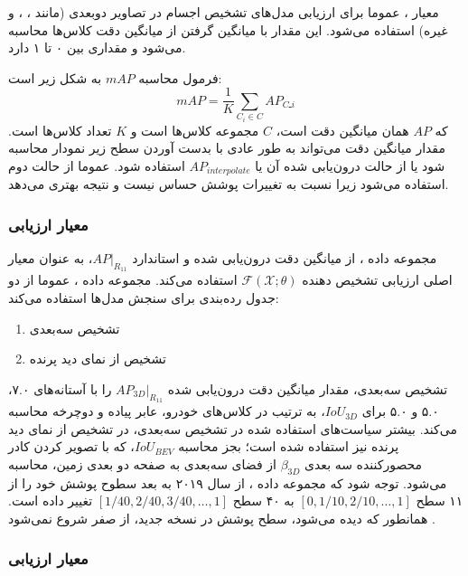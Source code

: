 معیار ، عموما برای ارزیابی مدل‌های تشخیص اجسام در تصاویر دوبعدی (مانند ، ،  و غیره) استفاده می‌شود. این مقدار با میانگین گرفتن از میانگین دقت کلاس‌ها محاسبه می‌شود و مقداری بین ۰ تا ۱ دارد.

فرمول محاسبه‌ $mAP$ به شکل زیر است:
\begin{equation}
    mAP = \frac{1}{K}\sum_{C_i \in C}{AP_{Cـi}}
\end{equation}
 که $AP$ همان میانگین دقت است، $C$ مجموعه کلاس‌ها است و $K$ تعداد کلاس‌ها است. مقدار میانگین دقت می‌تواند به طور عادی با بدست آوردن سطح زیر نمودار محاسبه شود یا از حالت درون‌یابی شده آن یا $AP_{interpolate}$ استفاده شود. عموما از حالت دوم استفاده می‌شود زیرا نسبت به تغییرات پوشش حساس نیست و نتیجه بهتری می‌دهد.

 \subsubsection{معیار ارزیابی }
مجموعه داده ، از میانگین دقت درون‌یابی شده و استاندارد $AP \vert_{R_{11}}$، به عنوان معیار اصلی ارزیابی تشخیص دهنده $\mathcal{F} (\mathcal{X} ; \theta)$ استفاده می‌کند. مجموعه داده ، عموما از دو جدول رده‌بندی برای سنجش مدل‌ها استفاده می‌کند:
\begin{enumerate}
    \item تشخیص سه‌بعدی
    \item  تشخیص از نمای دید پرنده 
\end{enumerate}
تشخیص سه‌بعدی، مقدار میانگین دقت درون‌یابی شده‌ $AP_{3D} \vert_{R_{11}}$ را با آستانه‌های ۷.۰، ۵.۰ و ۵.۰ برای $IoU_{3D}$، به ترتیب در کلاس‌های خودرو، عابر پیاده و دوچرخه محاسبه می‌کند.
بیشتر سیاست‌های استفاده شده در تشخیص سه‌بعدی، در تشخیص از نمای دید پرنده نیز استفاده شده است؛ بجز محاسبه $IoU_{BEV}$، که با تصویر کردن کادر محصورکننده سه بعدی $\beta_{3D}$ از فضای سه‌بعدی به صفحه دو بعدی زمین، محاسبه می‌شود. توجه شود که مجموعه داده ، از سال ۲۰۱۹ به بعد سطوح پوشش خود را از ۱۱ سطح $\left[0, 1/10, 2/10, \ldots, 1\right]$ به ۴۰ سطح $\left[1/40, 2/40, 3/40, \ldots, 1\right]$ تغییر داده است. همانطور که دیده می‌شود، سطح پوشش در نسخه جدید، از صفر شروع نمی‌شود \cite{qian20223d}.

\subsubsection{معیار ارزیابی }

